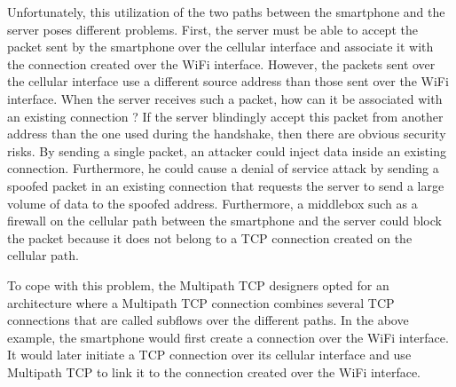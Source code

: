 \documentclass[letterpaper,10pt,english]{sphinxmanual}
\begin{document}
Unfortunately, this utilization of the two paths between the smartphone and the server poses different problems. First, the server must be able to accept the packet sent by the smartphone over the cellular interface and associate it with the connection created over the Wi\sphinxhyphen{}Fi interface. However, the packets sent over the cellular interface use a different source address than those sent over the Wi\sphinxhyphen{}Fi interface. When the server receives such a packet, how can it be associated with an existing connection ? If the server blindingly accept this packet from another address than the one used during the handshake, then there are obvious security risks. By sending a single packet, an attacker could inject data inside an existing connection. Furthermore, he could cause a denial of service attack by sending a spoofed packet in an existing connection that requests the server to send a large volume of data to the spoofed address. Furthermore, a middlebox such as a firewall on the cellular path between the smartphone and the server could block the packet because it does not belong to a TCP connection created on the cellular path.

\sphinxAtStartPar
To cope with this problem, the Multipath TCP designers opted for an architecture where a Multipath TCP connection combines several TCP connections that are called subflows over the different paths. In the above example, the smartphone would first create a connection over the Wi\sphinxhyphen{}Fi interface. It would later initiate a TCP connection over its cellular interface and use Multipath TCP to link it to the connection created over the Wi\sphinxhyphen{}Fi interface.
\end{document}
